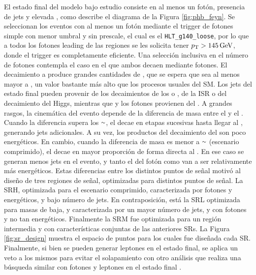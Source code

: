 El estado final del modelo bajo estudio consiste en al menos un fotón, presencia de jets y elevada \met, como describe el diagrama de la Figura \ref{fig:phb_feyn}. 
Se seleccionan los eventos con al menos un fotón mediante 
el trigger de fotones simple con menor umbral y sin prescale, el cual es el \texttt{HLT\_g140\_loose}, por lo que a todos los fotones leading de las regiones se les solicita tener $p_{\text{T}}>145\,\text{GeV}$, donde el trigger es completamente eficiente. Una selección inclusiva en el número de fotones contempla el caso en el que ambos \ninoone decaen mediante fotones. El decaimiento a \gravino produce grandes cantidades de \met, que se espera que sea al menos mayor a , un valor bastante más alto que los procesos usuales del SM. 
Los jets del estado final pueden provenir de los decaimientos de los \chinoonepm o \ninotwo, de la ISR o del decaimiento del Higgs, mientras que \met y los fotones provienen del \ninoone.
A grandes rasgos, la cinemática del evento depende de la diferencia de masa entre el \gluino y el \ninoone. 
Cuando la diferencia supera los {$\smallsim$}, el \gluino decae en etapas sucesivas hasta llegar al \ninoone, generando jets adicionales. A su vez, los productos del decaimiento del \ninoone son poco energéticos. En cambio, cuando la diferencia de masa es menor a {$\smallsim$} (escenario comprimido), el \gluino decae en mayor proporción de forma directa al \ninoone. En ese caso se generan menos jets en el evento, y tanto el \pt del fotón como \met van a ser relativamente más energéticos.
Estas diferencias entre los distintos puntos de señal motivó al diseño de tres regiones de señal, optimizadas para distintos puntos de señal. La SRH, optimizada para el escenario comprimido, caracterizada por fotones y \met energéticos, y bajo número de jets. En contraposición, está la SRL optimizada para masas de \ninoone baja, y caracterizada por un mayor número de jets, y con fotones y \met no tan energéticos. Finalmente la SRM fue optimizada para un región intermedia y con características conjuntas de las anteriores SRs. La Figura \ref{fig:sr_design} muestra el espacio de puntos para los cuales fue diseñada cada SR. Finalmente, si bien se pueden generar leptones en el estado final, se aplica un veto a los mismos para evitar el solapamiento con otro análisis que realiza una búsqueda similar con fotones y leptones en el estado final \cite{diph_8TeV}.

